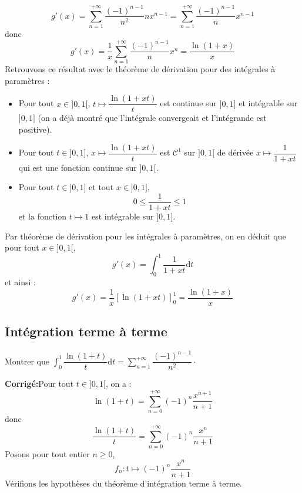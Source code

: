 \documentclass[a4paper,twoside,french,11pt]{VcCours}
\newcommand{\dt}{\text{d}t}
\newcommand{\corr}{\textbf{Corrigé:}}
\begin{document}
\begin{enumerate}
$$g'(x) =  \sum_{n=1}^{+ \infty} \dfrac{(-1)^{n-1}}{n^2} nx^{n-1} = \sum_{n=1}^{+ \infty} \dfrac{(-1)^{n-1}}{n} x^{n-1}$$
donc 
$$ g'(x) = \dfrac{1}{x} \sum_{n=1}^{+ \infty} \dfrac{(-1)^{n-1}}{n} x^{n} = \dfrac{\ln(1+x)}{x}$$
Retrouvons ce résultat avec le théorème de dérivation pour des intégrales à paramètres :
\begin{itemize}
\item Pour tout $x \in ]0,1[$, $t \mapsto \dfrac{\ln(1+xt)}{t}$ est continue sur $]0,1]$ et intégrable sur $]0,1]$ (on a déjà montré que l'intégrale convergeait et l'intégrande est positive).
\item Pour tout $t \in ]0,1]$, $x \mapsto \dfrac{\ln(1+xt)}{t}$ est $\mathcal{C}^1$ sur $]0,1[$ de dérivée $x \mapsto \dfrac{1}{1+xt}$ qui est une fonction continue sur $]0,1[$.
\item Pour tout $t \in ]0,1]$ et tout $x \in ]0,1]$,
$$ 0 \leq \dfrac{1}{1+xt} \leq 1$$
et la fonction $t \mapsto 1$ est intégrable sur $]0,1]$.
\end{itemize}
Par théorème de dérivation pour les intégrales à paramètres, on en déduit que pour tout $x \in ]0,1[$,
$$ g'(x) = \int_{0}^1 \dfrac{1}{1+xt} \dt$$
et ainsi :
$$ g'(x) = \dfrac{1}{x} [ \ln(1+xt) ]_0^1 = \dfrac{\ln(1+x)}{x}$$
\end{enumerate}

\subsection{Intégration terme à terme}


\begin{Exercice}{} Montrer que $\int_{0}^1 \dfrac{\ln(1+t)}{t}\dt = \sum_{n=1}^{+ \infty} \dfrac{(-1)^{n-1}}{n^2} \cdot$
\end{Exercice}

\corr Pour tout $t \in ]0,1[$, on a :
$$ \ln(1+t) = \sum_{n=0}^{+ \infty} (-1)^{n} \dfrac{x^{n+1}}{n+1}$$
donc
$$ \dfrac{\ln(1+t)}{t} = \sum_{n=0}^{+ \infty} (-1)^{n} \dfrac{x^{n}}{n+1}$$
Posons pour tout entier $n \geq 0$,
$$ f_n : t \mapsto (-1)^{n} \dfrac{x^{n}}{n+1}$$
Vérifions les hypothèses du théorème d'intégration terme à terme.
\end{document}
